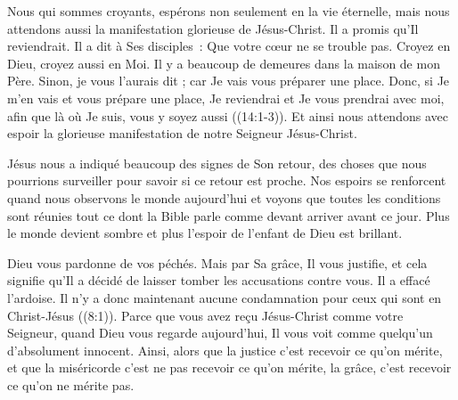 
Nous qui sommes croyants, espérons non seulement en la vie éternelle,
 mais nous attendons aussi la manifestation glorieuse de Jésus-Christ.
 Il a promis qu'Il reviendrait. Il a dit à Ses disciples~: 
 \og Que votre cœur ne se trouble pas. Croyez en Dieu, croyez aussi en Moi.
 Il y a beaucoup de demeures dans la maison de mon Père.
 Sinon, je vous l'aurais dit ; car Je vais vous préparer une place.
 Donc, si Je m'en vais et vous prépare une place, Je reviendrai
 et Je vous prendrai avec moi, afin que là où Je suis,
 vous y soyez aussi \fg{} ((14:1-3)).
 Et ainsi nous attendons avec espoir la glorieuse manifestation
 de notre Seigneur Jésus-Christ. 

Jésus nous a indiqué beaucoup des signes de Son retour,
 des choses que nous pourrions surveiller pour savoir si ce retour est proche.
 Nos espoirs se renforcent quand nous observons le monde aujourd'hui
 et voyons que toutes les conditions sont réunies \ocadr tout ce dont la Bible
 parle comme devant arriver avant ce jour.
 Plus le monde devient sombre et plus l'espoir de l'enfant de Dieu
 est brillant. 

\dvrule






 Dieu vous pardonne de vos péchés.
 Mais par Sa grâce, Il vous justifie, et cela signifie qu'Il a décidé
 de laisser tomber les accusations contre vous. Il a effacé l'ardoise.
 \og Il n'y a donc maintenant aucune condamnation pour ceux
 qui sont en Christ-Jésus \fg{} ((8:1)).
 Parce que vous avez reçu Jésus-Christ comme votre Seigneur,
 quand Dieu vous regarde aujourd'hui, Il vous voit comme quelqu'un
 d'absolument innocent. Ainsi, alors que la justice c'est recevoir
 ce qu'on mérite, et que la miséricorde c'est ne pas recevoir
 ce qu'on mérite, la grâce, c'est recevoir ce qu'on ne mérite pas. 

